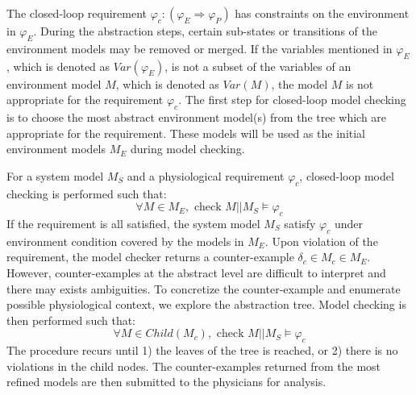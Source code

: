 The closed-loop requirement $\varphi_c:(\varphi_E\Rightarrow\varphi_P)$ has constraints on the environment in $\varphi_E$. During the abstraction steps, certain sub-states or transitions of the environment models may be removed or merged. If the variables mentioned in $\varphi_E$, which is denoted as $Var(\varphi_E)$, is not a subset of the variables of an environment model $M$, which is denoted as $Var(M)$, the model $M$ is not appropriate for the requirement $\varphi_c$. The first step for closed-loop model checking is to choose the most abstract environment model(s) from the tree which are appropriate for the requirement. These models will be used as the initial environment models $M_E$ during model checking. 

For a system model $M_S$ and a physiological requirement $\varphi_c$, closed-loop model checking is performed such that:
$$\forall M\in M_E, \text{ check } M||M_S\models\varphi_c$$
If the requirement is all satisfied, the system model $M_S$ satisfy $\varphi_c$ under environment condition covered by the models in $M_E$. Upon violation of the requirement, the model checker returns a counter-example $\delta_c\in M_c\in M_E$. However, counter-examples at the abstract level are difficult to interpret and there may exists ambiguities. To concretize the counter-example and enumerate possible physiological context, we explore the abstraction tree. Model checking is then performed such that:
$$\forall M\in Child(M_c), \text{ check } M||M_S\models\varphi_c$$  
The procedure recurs until 1) the leaves of the tree is reached, or 2) there is no violations in the child nodes. The counter-examples returned from the most refined models are then submitted to the physicians for analysis. 




